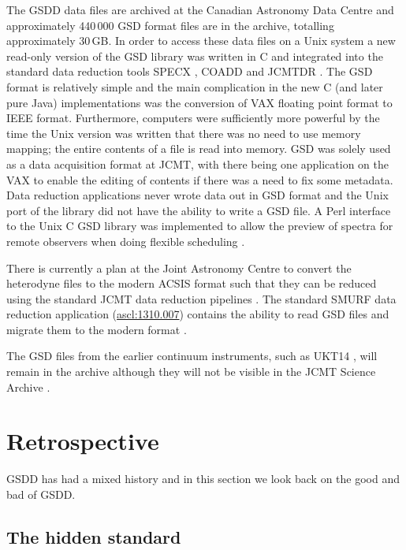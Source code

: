 \documentclass[final,authoryear,5p,times,twocolumn]{elsarticle}
\newcommand{\ascl}[1]{\href{http://www.ascl.net/#1}{ascl:#1}}
\begin{document}
The GSDD data files are archived at the Canadian Astronomy Data
Centre and approximately 440\,000 GSD format files are in the
archive, totalling approximately 30\,GB. In order to access these data
files on a Unix system a new read-only version of the GSD library was
written in C \citep[][\ascl{1503.009}]{SUN229} and integrated into the standard data
reduction tools SPECX \citep[][\ascl{1310.008}]{SPECX,1990JCMTP...9...25P}, COADD
\citep[][\ascl{1411.020}]{COADD}  and JCMTDR
\citep[][\ascl{1406.019}]{SUN132}.  The GSD format is relatively
simple and the main complication in the new C (and later pure Java)
implementations was the conversion of VAX floating point format to
IEEE format. Furthermore, computers were sufficiently more powerful
by the time the Unix version was written that there was no need to use
memory mapping; the entire contents of a file is read into memory.
GSD was solely used as a data acquisition format at JCMT, with there
being one application on the VAX to enable the editing of contents if
there was a need to fix some metadata. Data reduction applications
never wrote data out in GSD format and the Unix port of the library
did not have the ability to write a GSD file.
A Perl interface to the Unix C GSD library \citep{1999ASPC..172..494J}
was implemented to allow the preview of spectra for remote observers
when doing flexible scheduling \citep{1997ASPC..125..401J}.

There is currently a plan at the Joint Astronomy Centre to convert the
heterodyne files to the modern ACSIS format \citep{OCS_ICD_022} such that they can be
reduced using the standard JCMT data reduction pipelines
\citep{2015ACSISDR,2008ASPC..394..565J}. The standard SMURF data reduction application
(\ascl{1310.007}\nocite{2013ascl.soft10007J}) contains the ability to
read GSD files and migrate them to the modern format \citep{SUN259}.

The GSD files from the earlier continuum instruments, such as UKT14
\citep{1990MNRAS.243..126D}, will remain in the archive although they
will not be visible in the JCMT Science Archive \citep{2015Economou}.


\section{Retrospective}

GSDD has had a mixed history and in this section we look back on the
good and bad of GSDD.

\subsection{The hidden standard}
\end{document}

